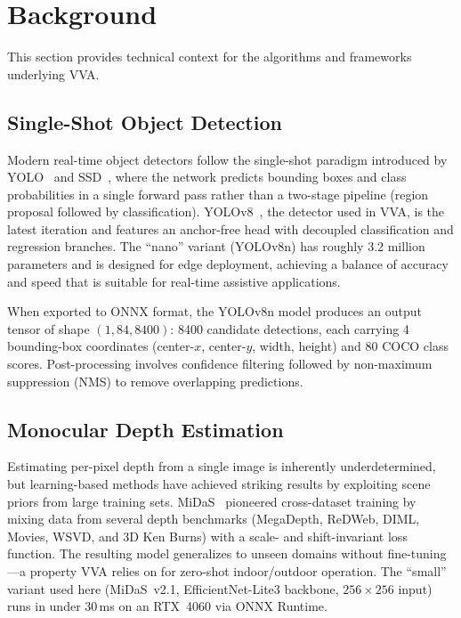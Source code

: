 \section{Background}
\label{sec:background}

This section provides technical context for the algorithms and frameworks underlying VVA.

\subsection{Single-Shot Object Detection}

Modern real-time object detectors follow the single-shot paradigm introduced by YOLO~\cite{redmon2016yolo} and SSD~\cite{liu2016ssd}, where the network predicts bounding boxes and class probabilities in a single forward pass rather than a two-stage pipeline (region proposal followed by classification). YOLOv8~\cite{jocher2023yolov8}, the detector used in VVA, is the latest iteration and features an anchor-free head with decoupled classification and regression branches. The ``nano'' variant (YOLOv8n) has roughly 3.2 million parameters and is designed for edge deployment, achieving a balance of accuracy and speed that is suitable for real-time assistive applications.

When exported to ONNX format, the YOLOv8n model produces an output tensor of shape $(1, 84, 8400)$: 8400 candidate detections, each carrying 4 bounding-box coordinates (center-$x$, center-$y$, width, height) and 80 COCO class scores. Post-processing involves confidence filtering followed by non-maximum suppression (NMS) to remove overlapping predictions.

\subsection{Monocular Depth Estimation}

Estimating per-pixel depth from a single image is inherently underdetermined, but learning-based methods have achieved striking results by exploiting scene priors from large training sets. MiDaS~\cite{ranftl2020midas} pioneered cross-dataset training by mixing data from several depth benchmarks (MegaDepth, ReDWeb, DIML, Movies, WSVD, and 3D Ken Burns) with a scale- and shift-invariant loss function. The resulting model generalizes to unseen domains without fine-tuning---a property VVA relies on for zero-shot indoor/outdoor operation. The ``small'' variant used here (MiDaS~v2.1, EfficientNet-Lite3 backbone, $256{\times}256$ input) runs in under 30\,ms on an RTX~4060 via ONNX Runtime.

